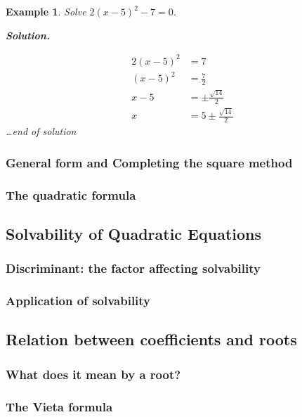 \documentclass[12pt]{article}
\newtheorem*{example}{Example}
\newenvironment{solution}{\textbf{Solution.} \par}{\hfill \textit{\dots end of solution}}
\begin{document}
    \begin{example}
        Solve $2(x-5)^2-7=0$.

        \begin{solution}
            \begin{align*}
                2(x-5)^2&=7\\
                (x-5)^2&=\frac{7}{2}\\
                x-5&=\pm\frac{\sqrt{14}}{2}\\
                x&=5\pm\frac{\sqrt{14}}{2}
            \end{align*}
        \end{solution}
    \end{example}

    \subsubsection*{General form and Completing the square method}

    \subsubsection*{The quadratic formula}

    \subsection{Solvability of Quadratic Equations}

    \subsubsection*{Discriminant: the factor affecting solvability}

    \subsubsection*{Application of solvability}

    \subsection{Relation between coefficients and roots}

    \subsubsection*{What does it mean by a root?}

    \subsubsection*{The Vieta formula}
\end{document}
